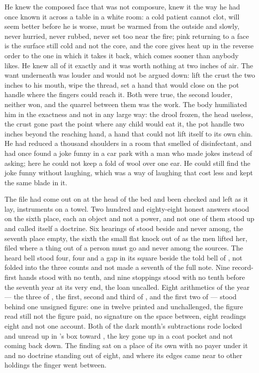 He knew the composed face that was not composure, knew it the way he had once known it across a table in a white room: a cold patient cannot clot, will seem better before he is worse, must be warmed from the outside and slowly, never hurried, never rubbed, never set too near the fire; pink returning to a face is the surface still cold and not the core, and the core gives heat up in the reverse order to the one in which it takes it back, which comes sooner than anybody likes. He knew all of it exactly and it was worth nothing at two inches of air. The want underneath was louder and would not be argued down: lift the crust the two inches to his mouth, wipe the thread, set a hand that would close on the pot handle where the fingers could reach it. Both were true, the second louder, neither won, and the quarrel between them was the work. The body humiliated him in the exactness and not in any large way: the drool frozen, the head useless, the crust gone past the point where any child would eat it, the pot handle two inches beyond the reaching hand, a hand that could not lift itself to its own chin. He had reduced a thousand shoulders in a room that smelled of disinfectant, and had once found a joke funny in a car park with a man who made jokes instead of asking; here he could not keep a fold of wool over one ear. He could still find the joke funny without laughing, which was a way of laughing that cost less and kept the same blade in it.

\scenebreak

The file had come out on  at the head of the bed and been checked and left as it lay, instruments on a towel. Two hundred and eighty-eight honest answers stood on the sixth place, each an object and not a power, and not one of them stood up and called itself a doctrine. Six hearings of  stood beside and never among, the seventh place empty, the sixth the small flat knock out of  as the men lifted her, filed where a thing out of a person must go and never among the sources. The heard bell stood four, four and a gap in its square beside the told bell of , not folded into the three counts and not made a seventh of the full note. Nine record-first hands stood with no tenth, and nine stoppings stood with no tenth before the seventh year at its very end, the loan uncalled. Eight arithmetics of the year --- the three of , the first, second and third of , and the first two of  --- stood behind one unsigned figure: one in twelve printed and unchallenged, the figure read still not the figure paid, no signature on the space between, eight readings eight and not one account. Both of the dark month's subtractions rode locked and unread up  in 's box toward , the key gone up in a coat pocket and not coming back down. The finding sat on a place of its own with no payer under it and no doctrine standing out of eight, and where its edges came near to other holdings the finger went between.

